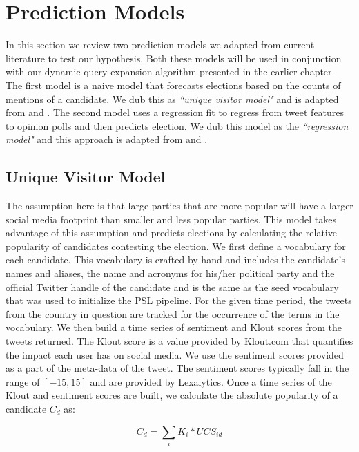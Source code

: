 \chapter{Prediction Models}
In this section we review two prediction models we adapted from current literature to test our hypothesis. 
Both these models will be used in conjunction with our dynamic query expansion algorithm presented in the earlier
chapter.
The first model is a naive model that forecasts elections based on the counts of mentions of a candidate.
We dub this as  \emph{``unique visitor model"} and is adapted from \cite{saez2011total} and \cite{tumasjan2010predicting}.
The second model uses a regression fit to regress from tweet features to opinion polls and then predicts election. 
We dub this model as the \emph{``regression model"} and this approach
is adapted from \cite{bermingham2011using} and \cite{o2010tweets}.

\section{Unique Visitor Model}
The assumption here is that
large parties that are more popular will have a larger social media footprint than smaller and less popular parties. 
This model takes advantage of this assumption and predicts elections by calculating the relative popularity of candidates contesting the election.
We first define a vocabulary for each candidate. 
This vocabulary is crafted by hand and includes the candidate's names and aliases, the name and acronyms for his/her political party and the official Twitter handle of the candidate and is the
same as the seed vocabulary that was used to initialize the PSL pipeline.
For the given time period, the tweets from the country in question are tracked for the occurrence of the terms in the vocabulary.
We then build a time series of sentiment and Klout scores from the tweets returned.
The Klout score is a value provided by Klout.com that quantifies the impact each user has on social media. 
We use the sentiment scores provided as a part of the meta-data of the tweet.
The sentiment scores typically fall in the range of $[-15,15]$ and are provided by Lexalytics.
Once a time series of the Klout and sentiment scores are built, we calculate the absolute popularity 
of a candidate $C_d$ as:

\begin{equation}
{C_d} = \sum_i K_i * UCS_{id}
\end{equation}

